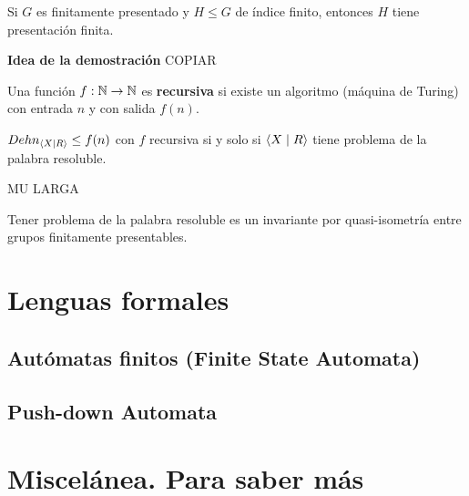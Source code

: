 \documentclass[twoside, 11pt]{article}
\begin{document}
\begin{coro}
Si $G$ es finitamente presentado y $H\leq G$ de índice finito, entonces $H$ tiene presentación finita.
\end{coro}

\textbf{Idea de la demostración}
COPIAR

\begin{defi}
Una función $f:\mathbb{N}\to\mathbb{N}$ es \textbf{recursiva} si existe un algoritmo (máquina de Turing) con entrada $n$ y con salida $f(n)$. 
\end{defi}

\begin{teorema}
$Dehn_{\langle{X\mid R}\rangle}\leq f(n)$ con $f$ recursiva si y solo si $\langle{X\mid R}\rangle$ tiene problema de la palabra resoluble. 
\end{teorema}
\begin{dem}
MU LARGA
\QED
\end{dem}

\begin{coro}
Tener problema de la palabra resoluble es un invariante por quasi-isometría entre grupos finitamente presentables. 
\end{coro}
\section{Lenguas formales}
\subsection{Autómatas finitos (Finite State Automata)}
\subsection{Push-down Automata}

\section{Miscelánea. Para saber más}
\end{document}

